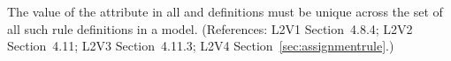 The value of the  attribute in all \AssignmentRule and
\RateRule definitions must be unique across the set of all such rule
definitions in a model.  (References: L2V1 Section~4.8.4; 
L2V2 Section~4.11; L2V3 Section~4.11.3; L2V4 Section~\ref{sec:assignmentrule}.)
